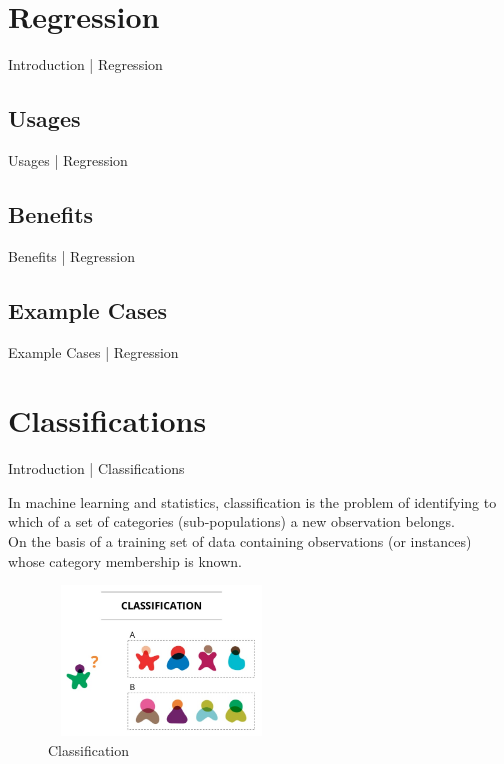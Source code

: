 \documentclass[10pt]{beamer}
\begin{document}
	\section{Regression}
		\begin{frame}{Introduction | Regression}
		\end{frame}
		\subsection{Usages}
			\begin{frame}{Usages | Regression}
			\end{frame}
		\subsection{Benefits}
			\begin{frame}{Benefits | Regression}
			\end{frame}
		\subsection{Example Cases}
			\begin{frame}{Example Cases | Regression}
			\end{frame}
	
	\section{Classifications}
		\begin{frame}{Introduction | Classifications}
		\begin{center}
				\large{In machine learning and statistics, classification is the problem of identifying to which of a set of categories (sub-populations) a new observation belongs.}\\
				\bigskip
				\small{ On the basis of a training set of data containing observations (or instances) whose category 							membership is known.}
				\begin{figure}
				\centering
				\includegraphics[width=60mm,height=40mm]{images/barun_1}
				\caption[]{Classification}
				\end{figure}
			\end{center}

		\end{frame}
\end{document}
